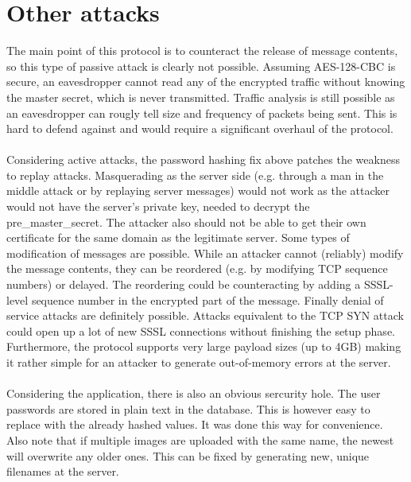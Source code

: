 \documentclass{article}
\begin{document}
\section{Other attacks}
The main point of this protocol is to counteract the release of message contents, so this type of passive attack is clearly not possible. Assuming AES-128-CBC is secure, an eavesdropper cannot read any of the encrypted traffic without knowing the master secret, which is never transmitted. Traffic analysis is still possible as an eavesdropper can rougly tell size and frequency of packets being sent. This is hard to defend against and would require a significant overhaul of the protocol. \\ \\
Considering active attacks, the password hashing fix above patches the weakness to replay attacks. Masquerading as the server side (e.g. through a man in the middle attack or by replaying server messages) would not work as the attacker would not have the server's private key, needed to decrypt the pre\_master\_secret. The attacker also should not be able to get their own certificate for the same domain as the legitimate server. Some types of modification of messages are possible. While an attacker cannot (reliably) modify the message contents, they can be reordered (e.g. by modifying TCP sequence numbers) or delayed. The reordering could be counteracting by adding a SSSL-level sequence number in the encrypted part of the message. Finally denial of service attacks are definitely possible. Attacks equivalent to the TCP SYN attack could open up a lot of new SSSL connections without finishing the setup phase. Furthermore, the protocol supports very large payload sizes (up to 4GB) making it rather simple for an attacker to generate out-of-memory errors at the server. \\ \\
Considering the application, there is also an obvious sercurity hole. The user passwords are stored in plain text in the database. This is however easy to replace with the already hashed values. It was done this way for convenience. Also note that if multiple images are uploaded with the same name, the newest will overwrite any older ones. This can be fixed by generating new, unique filenames at the server.
\end{document}
